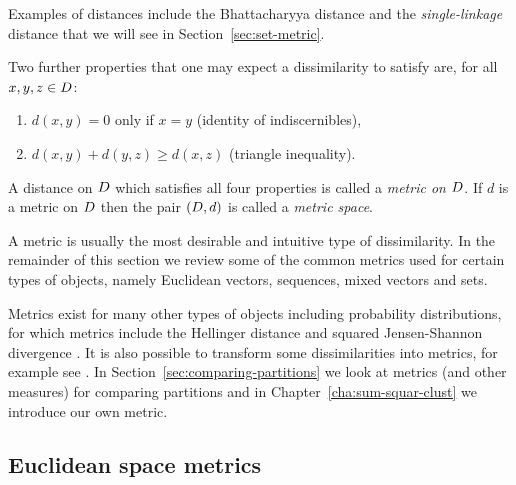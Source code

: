 Examples of distances include the Bhattacharyya distance
\citep{bhattacharyya43distance} and the \textit{single-linkage} distance that
we will see in Section~\ref{sec:set-metric}.

Two further properties that one may expect a dissimilarity to satisfy are, for
all $x,y,z \in D$:
\begin{enumerate}[resume]
\item \label{item:identity} $d(x,y) = 0$ only if $x=y$ \quad (identity of
  indiscernibles),
\item \label{item:tri-ineq} $d(x,y)+d(y,z) \geq d(x,z)$ \quad (triangle inequality).
\end{enumerate}
A distance on $D$ which satisfies all four properties is called a
\textit{metric on $D$}.  If $d$ is a metric on $D$ then the pair
$(D,d)$ is called a \textit{metric space}.

A metric is usually the most desirable and intuitive type of dissimilarity.
In the remainder of this section we review some of the common metrics used for
certain types of objects, namely Euclidean vectors, sequences, mixed vectors
and sets.

Metrics exist for many other types of objects including probability
distributions, for which metrics include the Hellinger distance and squared
Jensen-Shannon divergence \citep{endres03metric}.  It is also possible to
transform some dissimilarities into metrics, for example see
\citet[chap. 2.5]{everitt80}.  In Section~\ref{sec:comparing-partitions} we
look at metrics (and other measures) for comparing partitions and in
Chapter~\ref{cha:sum-squar-clust} we introduce our own metric.

\subsection{Euclidean space metrics}
\label{sec:eucl-space-metr}

